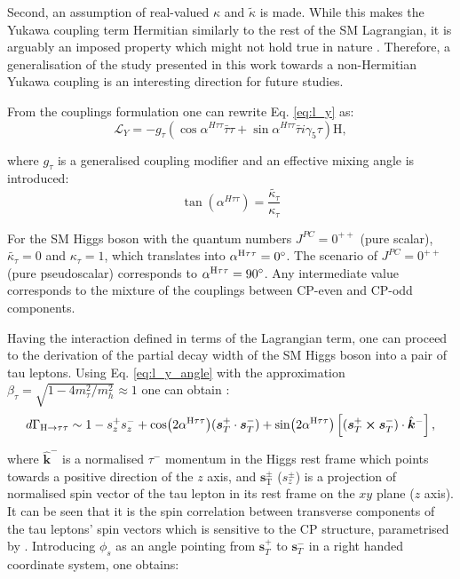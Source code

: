 Second, an assumption of real-valued $\kappa$ and $\tilde{\kappa}$ is made. While this makes the Yukawa coupling term Hermitian similarly to the rest of the SM Lagrangian, it is arguably an imposed property which might not hold true in nature \cite{Mannheim:2021kjs}. Therefore, a generalisation of the study presented in this work towards a non-Hermitian Yukawa coupling \cite{Korchin:2016rsf, Korchin:2021xxl} is an interesting direction for future studies.

From the couplings formulation one can rewrite Eq. \ref{eq:l_y} as:
\begin{equation}\label{eq:l_y_angle}
    \mathcal{L}_Y = -g_\tau(\cos\alpha^{H\tau\tau}\bar{\tau}\tau + \sin\alpha^{H\tau\tau}\bar{\tau}i\gamma_5\tau)\text{H},
\end{equation}

where $g_\tau$ is a generalised coupling modifier and an effective mixing angle is introduced:
\begin{equation}\label{eq:mixa}
    \tan(\alpha^{H\tau\tau}) = \frac{\tilde{\kappa_\tau}}{\kappa_\tau}
\end{equation}

For the SM Higgs boson with the quantum numbers $J^{PC} = 0^{++}$ (pure scalar), $\tilde{\kappa_\tau} = 0$ and $\kappa_\tau = 1$, which translates into $\alpha^{\text{H}\tau\tau} = 0^\circ$. The scenario of $J^{PC} = 0^{++}$ (pure pseudoscalar) corresponds to $\alpha^{\text{H}\tau\tau} = 90^\circ$. Any intermediate value corresponds to the mixture of the couplings between CP-even and CP-odd components.

Having the interaction defined in terms of the Lagrangian term, one can proceed to the derivation of the partial decay width of the SM Higgs boson into a pair of tau leptons. Using Eq. \ref{eq:l_y_angle} with the approximation $\beta_\tau = \sqrt{1-4m_\tau^2/m_h^2}\approx1$ one can obtain \cite{Berge:2014wta}:
\begin{equation}
    d\Gamma_{\text{H} \rightarrow \tau\tau} \sim 1 - s^+_zs^-_z + \cos(2\alpha^{\text{H}\tau\tau})(\boldsymbol{s}_T^+\cdot \boldsymbol{s}_T^-) + \sin(2\alpha^{\text{H}\tau\tau})\left[(\boldsymbol{s}_T^+\cross \boldsymbol{s}_T^-)\cdot\hat{\boldsymbol{k}}^-\right ],
\end{equation}

where $\hat{\boldsymbol{k}}^-$ is a normalised $\tau^-$ momentum in the Higgs rest frame which points towards a positive direction of the $z$ axis, and $\boldsymbol{s}_\text{T}^\pm$ ($s_z^\pm$) is a projection of normalised spin vector of the tau lepton in its rest frame on the $xy$ plane ($z$ axis). It can be seen that it is the spin correlation between transverse components of the tau leptons' spin vectors which is sensitive to the CP structure, parametrised by \mixa. Introducing $\phi_{s}$ as an angle pointing from $\boldsymbol{s}_T^+$ to $\boldsymbol{s}_T^-$ in a right handed coordinate system, one obtains:

